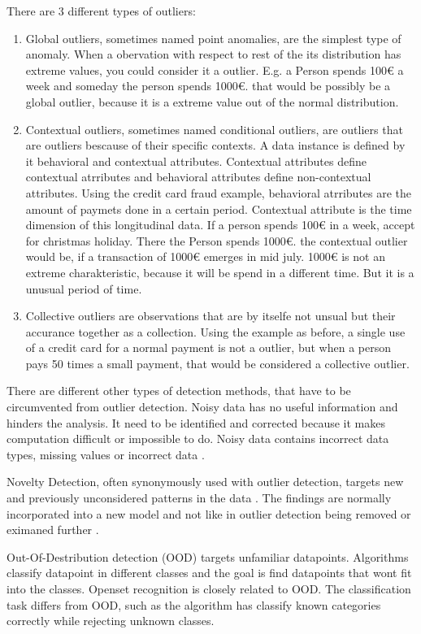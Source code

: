 There are 3 different types of outliers: 
\begin{enumerate}
\item Global outliers, sometimes named point anomalies, are the simplest type of anomaly. 
When a obervation with respect to rest of the its distribution has extreme values, you could consider it a outlier.
E.g. a Person spends 100€ a week and someday the person spends 1000€. that would be possibly be a global outlier, because it is 
a extreme value out of the normal distribution. 
\item Contextual outliers, sometimes named conditional outliers, are outliers that are outliers bescause of their specific contexts.
A data instance is defined by it behavioral and contextual attributes. 
Contextual attributes define contextual atrributes and behavioral attributes define non-contextual attributes.
Using the credit card fraud example, behavioral atrributes are the amount of paymets done in a certain period.
Contextual attribute is the time dimension of this longitudinal data. 
If a person spends 100€ in a week, accept for christmas holiday. There the Person spends 1000€.
the contextual outlier would be, if a transaction of 1000€ emerges in mid july.
1000€ is not an extreme charakteristic, because it will be spend in a different time.
But it is a unusual period of time. 
\item Collective outliers are observations that are by itselfe not unsual but their accurance together as a collection. 
Using the example as before, a single use of a credit card for a normal payment is not a outlier, but when a person pays 50 times
a small payment, that would be considered a collective outlier.
\end{enumerate}


There are different other types of detection methods, that have to be circumvented from outlier detection.
Noisy data has no useful information and hinders the analysis. 
It need to be identified and corrected because it makes computation difficult or impossible to do.
Noisy data contains incorrect data types, missing values or incorrect data \citep{smiti2020critical}.


Novelty Detection, often synonymously used with outlier detection, targets new and previously unconsidered patterns in the data \citep{domingues2019probabilistic}.
The findings are normally incorporated into a new model and not like in outlier detection being removed or eximaned further \citep{chandola2009anomaly}.

Out-Of-Destribution detection (OOD) targets unfamiliar datapoints.
Algorithms classify datapoint in different classes and the goal is find datapoints that wont fit into the classes.
Openset recognition is closely related to OOD. 
The classification task differs from OOD, such as the algorithm has classify known categories correctly while rejecting unknown classes.


